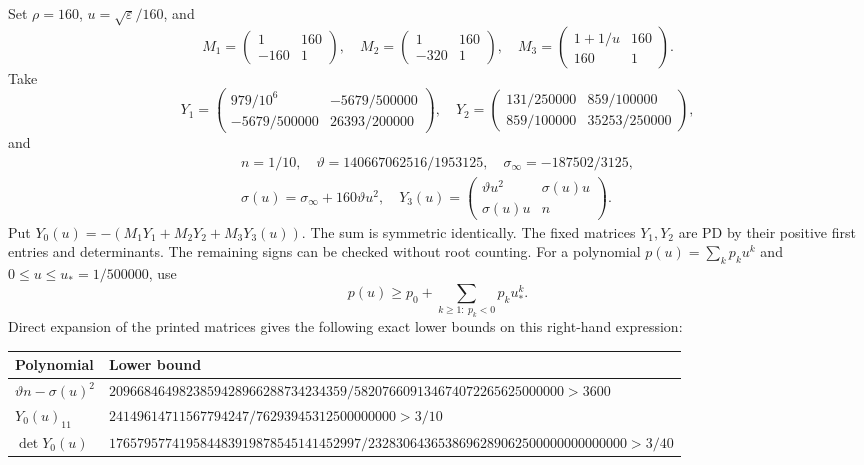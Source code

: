 Set $\rho=160$, $u=\sqrt\varepsilon/160$, and
\[
 M_1=\begin{pmatrix}1&160\\-160&1\end{pmatrix},\quad
 M_2=\begin{pmatrix}1&160\\-320&1\end{pmatrix},\quad
 M_3=\begin{pmatrix}1+1/u&160\\160&1\end{pmatrix}.
\]
Take
\[
 Y_1=\begin{pmatrix}979/10^6&-5679/500000\\-5679/500000&26393/200000\end{pmatrix},\quad
 Y_2=\begin{pmatrix}131/250000&859/100000\\859/100000&35253/250000\end{pmatrix},
\]
and
\[
 \begin{gathered}
 n=1/10,\quad \vartheta=140667062516/1953125,\quad
 \sigma_\infty=-187502/3125,\\
 \sigma(u)=\sigma_\infty+160\vartheta u^2,\quad
 Y_3(u)=\begin{pmatrix}\vartheta u^2&\sigma(u)u\\\sigma(u)u&n\end{pmatrix}.
 \end{gathered}
\]
Put $Y_0(u)=-(M_1Y_1+M_2Y_2+M_3Y_3(u))$. The sum is symmetric
identically. The fixed matrices $Y_1,Y_2$ are PD by their positive first
entries and determinants. The remaining signs can be checked without root
counting. For a polynomial $p(u)=\sum_k p_ku^k$ and
$0\le u\le u_*=1/500000$, use
\[
 p(u)\ge p_0+\sum_{k\ge1:\ p_k<0}p_ku_*^k.
\]
Direct expansion of the printed matrices gives the following exact lower
bounds on this right-hand expression:
\begin{center}\small
\begin{tabular}{@{}ll@{}}\toprule
 Polynomial & Lower bound\\\midrule
 $\vartheta n-\sigma(u)^2$ &
 $2096684649823859428966288734234359/582076609134674072265625000000>3600$\\
 $Y_0(u)_{11}$ &
 $24149614711567794247/76293945312500000000>3/10$\\
 $\det Y_0(u)$ &
 $176579577419584483919878545141452997/2328306436538696289062500000000000000>3/40$\\\bottomrule
\end{tabular}
\end{center}
